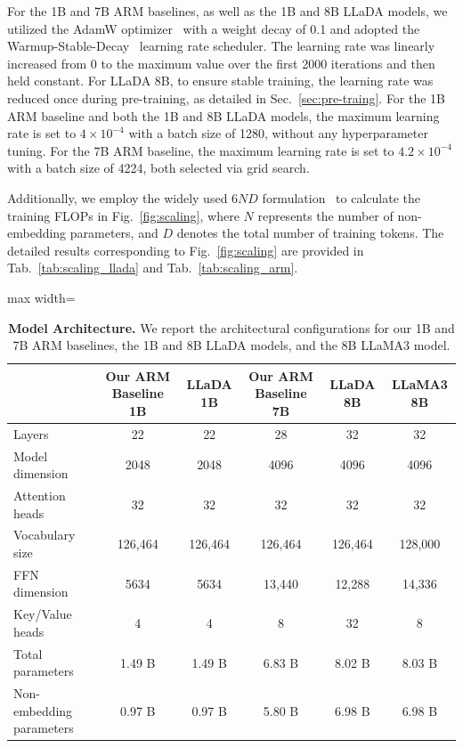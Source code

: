 \documentclass{article}
\begin{document}
For the 1B and 7B ARM baselines, as well as the 1B and 8B LLaDA models, we utilized the AdamW optimizer~\citep{loshchilov2017decoupled} with a weight decay of 0.1 and adopted the Warmup-Stable-Decay~\citep{hu2024minicpm} learning rate scheduler. The learning rate was linearly increased from 0 to the maximum value over the first 2000 iterations and then held constant. For LLaDA 8B, to ensure stable training, the learning rate was reduced once during pre-training, as detailed in Sec.~\ref{sec:pre-traing}. For the 1B ARM baseline and both the 1B and 8B LLaDA models, the maximum learning rate is set to $4 \times 10^{-4}$ with a batch size of 1280, without any hyperparameter tuning. For the 7B ARM baseline, the maximum learning rate is set to $4.2 \times 10^{-4}$ with a batch size of 4224, both selected via grid search.

Additionally, we employ the widely used $6ND$ formulation~\cite{kaplan2020scaling, hoffmann2022training} to calculate the training FLOPs in Fig.~\ref{fig:scaling}, where $N$ represents the number of non-embedding parameters, and $D$ denotes the total number of training tokens. The detailed results corresponding to Fig.~\ref{fig:scaling} are provided in Tab.~\ref{tab:scaling_llada} and Tab.~\ref{tab:scaling_arm}.


 \begin{table}[t!]
    \centering
    \caption{\textbf{Model Architecture.} We report the architectural configurations for our 1B and 7B ARM baselines, the 1B and 8B LLaDA models, and the 8B LLaMA3 model. }
    \vspace{.2cm}
    \label{table:8b}
    \begin{adjustbox}{max width=\textwidth}
    \begin{tabular}{lccccc}
      \toprule
         & Our ARM Baseline 1B & LLaDA 1B & Our ARM Baseline 7B & LLaDA 8B & LLaMA3 8B \\
         \midrule
         Layers & 22 & 22 & 28 & 32 & 32 \\
         \midrule
         Model dimension & 2048  & 2048 & 4096 &4096 & 4096 \\
         \midrule
         Attention heads & 32 & 32 & 32 & 32 & 32 \\
         \midrule
         Vocabulary size & 126,464 & 126,464 & 126,464 & 126,464 & 128,000 \\
         \midrule
         FFN dimension &5634 & 5634 & 13,440 & 12,288 & 14,336 \\   
         \midrule
         Key/Value heads & 4 & 4 & 8 & 32 & 8 \\
         \midrule
         Total parameters & 1.49 B & 1.49 B & 6.83 B & 8.02 B & 8.03 B \\
         \midrule
         Non-embedding parameters & 0.97 B & 0.97 B & 5.80 B & 6.98 B & 6.98 B\\
      \bottomrule
    \end{tabular}
    \end{adjustbox}
    \vspace{-.2cm}
\end{table}
\end{document}
